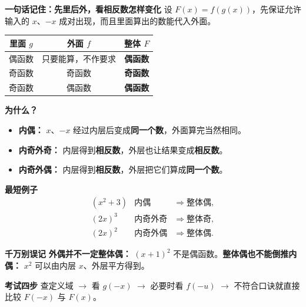 \clearpage
\begin{summarybox}
\textbf{\textcolor{CSummary}{一句话记住：先里后外，看相反数怎样变化}}
设 $F(x)=f(g(x))$，先保证允许输入的 $x$、$-x$ 成对出现，而且里面算出的数能代入外面。

\begin{center}
\renewcommand{\arraystretch}{1.35}
\begin{tabular}{c|c|c}
里面 $g$ & 外面 $f$ & 整体 $F$\\ \hline
偶函数 & 只要能算，不作要求 & \textbf{偶函数}\\
奇函数 & 奇函数 & \textbf{奇函数}\\
奇函数 & 偶函数 & \textbf{偶函数}
\end{tabular}
\end{center}

\textbf{\textcolor{CSummary}{为什么？}}
\begin{itemize}[leftmargin=*,itemsep=0.25em]
\item \textbf{内偶：} $x$、$-x$ 经过内层后变成\textbf{同一个数}，外面算完当然相同。
\item \textbf{内奇外奇：} 内层得到\textbf{相反数}，外层也让结果变成\textbf{相反数}。
\item \textbf{内奇外偶：} 内层得到\textbf{相反数}，外层把它们算成\textbf{同一个数}。
\end{itemize}

\textbf{\textcolor{CSummary}{最短例子}}
\[
\begin{array}{lll}
(x^2+3) &\text{内偶}&\Rightarrow \text{整体偶},\\
(2x)^3 &\text{内奇外奇}&\Rightarrow \text{整体奇},\\
(2x)^2 &\text{内奇外偶}&\Rightarrow \text{整体偶}.
\end{array}
\]

\textbf{\textcolor{CSummary}{千万别误记}}
\textbf{外偶并不一定整体偶：} $(x+1)^2$ 不是偶函数。\textbf{整体偶也不能倒推内偶：} $x^2$ 可以由内层 $x$、外层平方得到。

\textbf{\textcolor{CSummary}{考试四步}}
查定义域 $\rightarrow$ 看 $g(-x)$ $\rightarrow$ 必要时看 $f(-u)$ $\rightarrow$ 不符合口诀就直接比较 $F(-x)$ 与 $F(x)$。
\end{summarybox}
